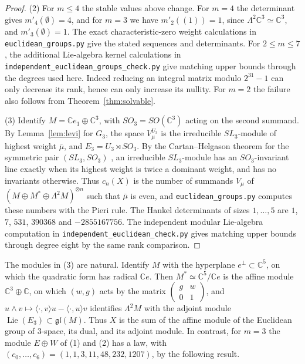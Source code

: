 \documentclass[11pt,reqno]{amsart}
\theoremstyle{definition}
\newcommand{\CC}{\mathbb C}
\DeclareMathOperator{\Lie}{Lie}
\begin{document}
\begin{proof}
(2) For $m\leq4$ the stable values above change. For $m=4$ the determinant gives $m'_4(\emptyset)=4$, and for $m=3$ we have $m'_2((1))=1$, since $\Lambda^2\CC^3\simeq\CC^3$, and $m'_3(\emptyset)=1$. The exact characteristic-zero weight calculations in \texttt{euclidean\_groups.py} give the stated sequences and determinants. For $2\le m\le7$, the additional Lie-algebra kernel calculations in \texttt{independent\_euclidean\_groups\_check.py} give matching upper bounds through the degrees used here. Indeed reducing an integral matrix modulo $2^{31}-1$ can only decrease its rank, hence can only increase its nullity. For $m=2$ the failure also follows from Theorem~\ref{thm:solvable}.

(3) Identify $M=\CC e_1\oplus\CC^3$, with $SO_3=SO(\CC^3)$ acting on the second summand. By Lemma~\ref{lem:levi} for $G_3$, the space $V_\mu^{U_3}$ is the irreducible $SL_3$-module of highest weight $\bar\mu$, and $E_3=U_3\rtimes SO_3$. By the Cartan--Helgason theorem for the symmetric pair $(SL_3,SO_3)$ \cite{GW}, an irreducible $SL_3$-module has an $SO_3$-invariant line exactly when its highest weight is twice a dominant weight, and has no invariants otherwise. Thus $c_n(X)$ is the number of summands $V_\mu$ of $(M\oplus M^*\oplus\Lambda^2M)^{\otimes n}$ such that $\bar\mu$ is even, and \texttt{euclidean\_groups.py} computes these numbers with the Pieri rule. The Hankel determinants of sizes $1,\ldots,5$ are $1$, $7$, $531$, $390368$ and $-2855167756$. The independent modular Lie-algebra computation in \texttt{independent\_euclidean\_check.py} gives matching upper bounds through degree eight by the same rank comparison.
\end{proof}

The modules in (3) are natural. Identify $M$ with the hyperplane $e^\perp\subset\CC^5$, on which the quadratic form has radical $\CC e$. Then $M^*\simeq\CC^5/\CC e$ is the affine module $\CC^3\oplus\CC$, on which $(w,g)$ acts by the matrix $\left(\begin{smallmatrix}g&w\\0&1\end{smallmatrix}\right)$, and $u\wedge v\mapsto\langle\cdot,v\rangle u-\langle\cdot,u\rangle v$ identifies $\Lambda^2M$ with the adjoint module $\Lie(E_3)\subset\mathfrak{gl}(M)$. Thus $X$ is the sum of the affine module of the Euclidean group of 3-space, its dual, and its adjoint module. In contrast, for $m=3$ the module $E\oplus W$ of (1) and (2) has a law, with $(c_0,\ldots,c_6)=(1,1,3,11,48,232,1207)$, by the following result.
\end{document}
